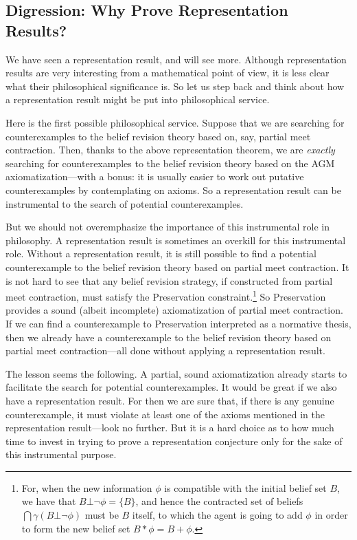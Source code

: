 \subsection{Digression: Why Prove Representation Results?}

We have seen a representation result, and will see more. Although representation results are very interesting from a mathematical point of view, it is less clear what their philosophical significance is. So let us step back and think about how a representation result might be put into philosophical service. 

Here is the first possible philosophical service. Suppose that we are searching for counterexamples to the belief revision theory based on, say, partial meet contraction. Then, thanks to the above representation theorem, we are {\em exactly} searching for counterexamples to the belief revision theory based on the AGM axiomatization---with a bonus: it is usually easier to work out putative counterexamples by contemplating on axioms. So a representation result can be instrumental to the search of potential counterexamples. 

But we should not overemphasize the importance of this instrumental role in philosophy. A representation result is sometimes an overkill for this instrumental role. Without a representation result, it is still possible to find a potential counterexample to the belief revision theory based on partial meet contraction. It is not hard to see that any belief revision strategy, if constructed from partial meet contraction, must satisfy the Preservation constraint.\footnote
	{For, when the new information $\phi$ is compatible with the initial belief set $B$, we have that $B \bot \neg\phi = \{B\}$, and hence the contracted set of beliefs $\bigcap \gamma(B \bot \neg\phi)$ must be $B$ itself, to which the agent is going to add $\phi$ in order to form the new belief set $B * \phi = B + \phi$.}
So Preservation provides a sound (albeit incomplete) axiomatization of partial meet contraction. If we can find a counterexample to Preservation interpreted as a normative thesis, then we already have a counterexample to the belief revision theory based on partial meet contraction---all done without applying a representation result. 

The lesson seems the following. A partial, sound axiomatization already starts to facilitate the search for potential counterexamples. It would be great if we also have a representation result. For then we are sure that, if there is any genuine counterexample, it must violate at least one of the axioms mentioned in the representation result---look no further. But it is a hard choice as to how much time to invest in trying to prove a representation conjecture only for the sake of this instrumental purpose.

